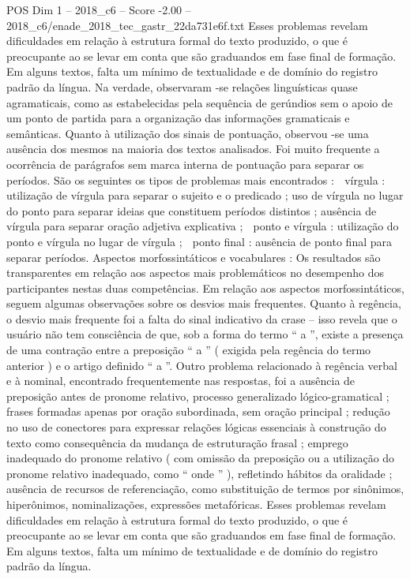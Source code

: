 \begin{textsample}{POS Dim 1 – 2018\_c6 – Score -2.00 – 2018\_c6/enade\_2018\_tec\_gastr\_22da731e6f.txt}
Esses problemas revelam dificuldades em relação à estrutura formal do texto produzido, o que é preocupante ao se levar em conta que são graduandos em fase final de formação.
Em alguns textos, falta um mínimo de textualidade e de domínio do registro padrão da língua.
Na verdade, observaram -se relações linguísticas quase agramaticais, como as estabelecidas pela sequência de gerúndios sem o apoio de um ponto de partida para a organização das informações gramaticais e semânticas.
Quanto à utilização dos sinais de pontuação, observou -se uma ausência dos mesmos na maioria dos textos analisados.
Foi muito frequente a ocorrência de parágrafos sem marca interna de pontuação para separar os períodos.
São os seguintes os tipos de problemas mais encontrados :  vírgula : utilização de vírgula para separar o sujeito e o predicado ; uso de vírgula no lugar do ponto para separar ideias que constituem períodos distintos ; ausência de vírgula para separar oração adjetiva explicativa ;  ponto e vírgula : utilização do ponto e vírgula no lugar de vírgula ;  ponto final : ausência de ponto final para separar períodos.
Aspectos morfossintáticos e vocabulares : Os resultados são transparentes em relação aos aspectos mais problemáticos no desempenho dos participantes nestas duas competências.
Em relação aos aspectos morfossintáticos, seguem algumas observações sobre os desvios mais frequentes.
Quanto à regência, o desvio mais frequente foi a falta do sinal indicativo da crase – isso revela que o usuário não tem consciência de que, sob a forma do termo “ a ”, existe a presença de uma contração entre a preposição “ a ” ( exigida pela regência do termo anterior ) e o artigo definido “ a ”.
Outro problema relacionado à regência verbal e à nominal, encontrado frequentemente nas respostas, foi a ausência de preposição antes de pronome relativo, processo generalizado lógico-gramatical ; frases formadas apenas por oração subordinada, sem oração principal ; redução no uso de conectores para expressar relações lógicas essenciais à construção do texto como consequência da mudança de estruturação frasal ; emprego inadequado do pronome relativo ( com omissão da preposição ou a utilização do pronome relativo inadequado, como “ onde ” ), refletindo hábitos da oralidade ; ausência de recursos de referenciação, como substituição de termos por sinônimos, hiperônimos, nominalizações, expressões metafóricas.
Esses problemas revelam dificuldades em relação à estrutura formal do texto produzido, o que é preocupante ao se levar em conta que são graduandos em fase final de formação.
Em alguns textos, falta um mínimo de textualidade e de domínio do registro padrão da língua.

\end{textsample}
